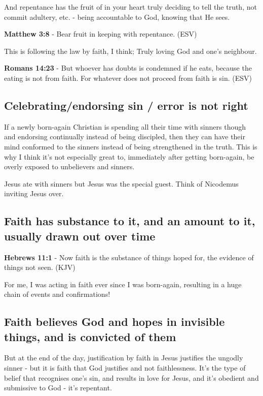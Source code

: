 \documentclass[11pt]{article}
\begin{document}
And repentance has the fruit of in your heart truly deciding to tell the truth, not commit adultery, etc. - being accountable to God, knowing that He sees.

\textbf{Matthew 3:8} - Bear fruit in keeping with repentance. (ESV)

This is following the law by faith, I think; Truly loving God and one's neighbour.

\textbf{Romans 14:23} - But whoever has doubts is condemned if he eats, because the eating is not from faith. For whatever does not proceed from faith is sin. (ESV)

\subsection{Celebrating/endorsing sin / error is not right}
\label{sec:orgb6150cd}

If a newly born-again Christian is spending all their time with sinners though and endorsing continually instead of being discipled, then they can
have their mind conformed to the sinners instead of being strengthened in the truth. This is why I think it's not especially great to, immediately after getting born-again,
be overly exposed to unbelievers and sinners.

Jesus ate with sinners but Jesus was the special guest. Think of Nicodemus inviting Jesus over.

\subsection{Faith has substance to it, and an amount to it, usually drawn out over time}
\label{sec:org4305c19}
\textbf{Hebrews 11:1} - Now faith is the substance of things hoped for, the evidence of things not seen. (KJV)

For me, I was acting in faith ever since I was born-again, resulting in a huge chain of events and confirmations!

\subsection{Faith believes God and hopes in invisible things, and is convicted of them}
\label{sec:org3504305}

But at the end of the day, justification by faith in Jesus justifies the ungodly sinner - but it is faith that God justifies and not faithlessness. It's the type of belief that recognises one's sin, and results in love for Jesus, and it's obedient and submissive to God - it's repentant.
\end{document}
